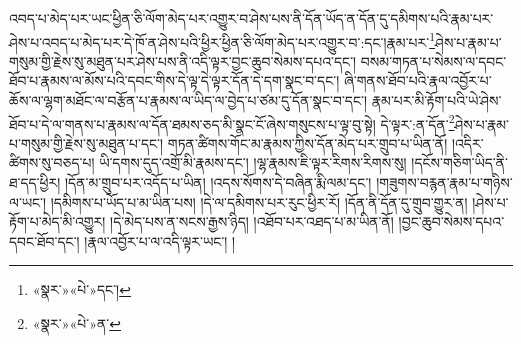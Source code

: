 འབད་པ་མེད་པར་ཡང་ཕྱིན་ཅི་ལོག་མེད་པར་འགྱུར་བ་ཤེས་པས་ནི་དོན་ཡོད་ན་དོན་དུ་དམིགས་པའི་རྣམ་པར་ཤེས་པ་འབད་པ་མེད་པར་དེ་ཁོ་ན་ཤེས་པའི་ཕྱིར་ཕྱིན་ཅི་ལོག་མེད་པར་འགྱུར་བ་:དང་།རྣམ་པར་\footnote{«སྣར་»«པེ་»དང་།}ཤེས་པ་རྣམ་པ་གསུམ་གྱི་རྗེས་སུ་མཐུན་པར་ཤེས་པས་ནི་འདི་ལྟར་བྱང་ཆུབ་སེམས་དཔའ་དང་། བསམ་གཏན་པ་སེམས་ལ་དབང་ཐོབ་པ་རྣམས་ལ་མོས་པའི་དབང་གིས་དེ་ལྟ་དེ་ལྟར་དོན་དེ་དག་སྣང་བ་དང་། ཞི་གནས་ཐོབ་པའི་རྣལ་འབྱོར་པ་ཆོས་ལ་ལྷག་མཐོང་ལ་བརྩོན་པ་རྣམས་ལ་ཡིད་ལ་བྱེད་པ་ཙམ་དུ་དོན་སྣང་བ་དང་། རྣམ་པར་མི་རྟོག་པའི་ཡེ་ཤེས་ཐོབ་པ་དེ་ལ་གནས་པ་རྣམས་ལ་དོན་ཐམས་ཅད་མི་སྣང་ངོ་ཞེས་གསུངས་པ་ལྟ་བུ་སྟེ། དེ་ལྟར་:ན་དོན་\footnote{«སྣར་»«པེ་»ན་}ཤེས་པ་རྣམ་པ་གསུམ་གྱི་རྗེས་སུ་མཐུན་པ་དང་། གཏན་ཚིགས་གོང་མ་རྣམས་ཀྱིས་དོན་མེད་པར་གྲུབ་པ་ཡིན་ནོ། །འདིར་ཚིགས་སུ་བཅད་པ། ཡི་དགས་དུད་འགྲོ་མི་རྣམས་དང་། །ལྷ་རྣམས་ཇི་ལྟར་རིགས་རིགས་སུ། །དངོས་གཅིག་ཡིད་ནི་ཐ་དད་ཕྱིར། །དོན་མ་གྲུབ་པར་འདོད་པ་ཡིན། །འདས་སོགས་དེ་བཞིན་རྨི་ལམ་དང་། །གཟུགས་བརྙན་རྣམ་པ་གཉིས་ལ་ཡང་། །དམིགས་པ་ཡོད་པ་མ་ཡིན་པས། །དེ་ལ་དམིགས་པར་རུང་ཕྱིར་རོ། །དོན་ནི་དོན་དུ་གྲུབ་གྱུར་ན། །ཤེས་པ་རྟོག་པ་མེད་མི་འགྱུར། །དེ་མེད་པས་ན་སངས་རྒྱས་ཉིད། །འཐོབ་པར་འཐད་པ་མ་ཡིན་ནོ། །བྱང་ཆུབ་སེམས་དཔའ་དབང་ཐོབ་དང་། །རྣལ་འབྱོར་པ་ལ་འདི་ལྟར་ཡང་། །

